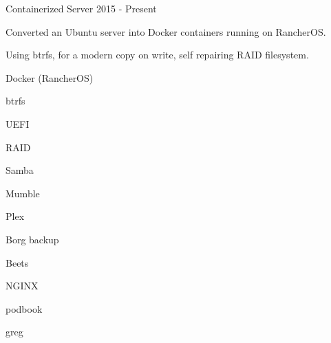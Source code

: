 

\begin{cventries}

  \cventry
    {} %
    {Containerized Server} %
    {} %
    {2015 - Present} %
    {%
      \begin{cvitems} %
        \item {Converted an Ubuntu server into Docker containers running on RancherOS.}
        \item {Using btrfs, for a modern copy on write, self repairing RAID filesystem.}
      \end{cvitems}
    }
    \begin{cventryskills}
      \item Docker (RancherOS)
      \item btrfs
      \item UEFI
      \item RAID
      \item Samba
      \item Mumble
      \item Plex
      \item Borg backup
      \item Beets
      \item NGINX
      \item podbook
      \item greg
    \end{cventryskills}

\end{cventries}
